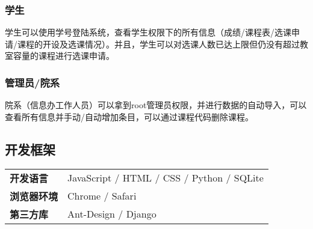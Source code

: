 \subsubsection{学生}
学生可以使用学号登陆系统，查看学生权限下的所有信息（成绩/课程表/选课申请/课程的开设及选课情况）。并且，学生可以对选课人数已达上限但仍没有超过教室容量的课程进行选课申请。
\subsubsection{管理员/院系}
院系（信息办工作人员）可以拿到root管理员权限，并进行数据的自动导入，可以查看所有信息并手动/自动增加条目，可以通过课程代码删除课程。


\subsection{开发框架}

\begin{table}[h]
\begin{tabular}{ll}
{\bf 开发语言}   & JavaScript / HTML / CSS / Python / SQLite \\
{\bf 浏览器环境} & Chrome / Safari \\
{\bf 第三方库}   & Ant-Design / Django                             
\end{tabular}
\end{table}






